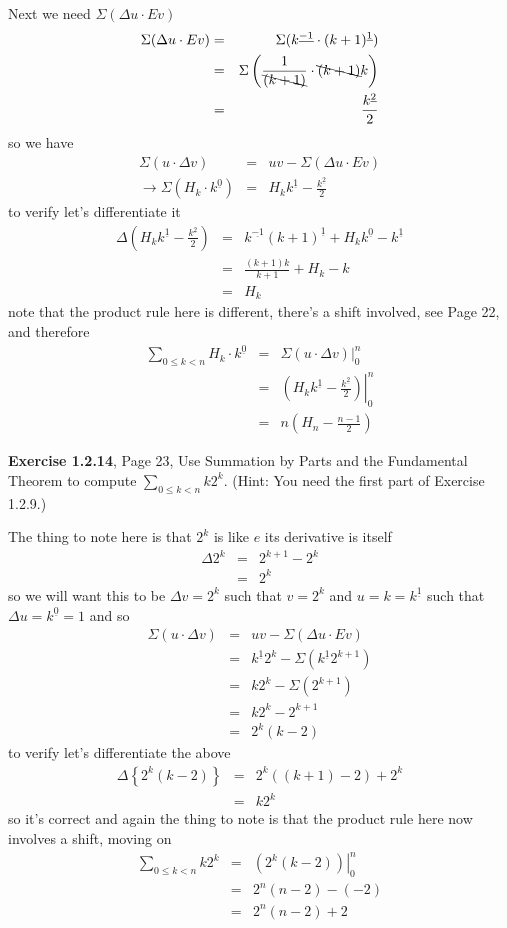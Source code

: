 \documentclass[aps,preprint,preprintnumbers,nofootinbib,showpacs,prd]{revtex4-1}
\newcommand{\nbea}{\begin{eqnarray*}}
\newcommand{\neea}{\end{eqnarray*}}
\begin{document}
Next we need $\Sigma(\Delta u\cdot Ev)$
%
\nbea
\Sigma(\Delta u\cdot Ev) & = & \Sigma(k^{\underline{-1}} \cdot (k+1)^{\underline 1}) \\
& = & \Sigma\left(\frac{1}{\bcancel{(k+1)}}\cdot \bcancel{(k+1)}k \right) \\
& = & \frac{k^{\underline 2}}{2}
\neea
%
so we have
%
\nbea
\Sigma (u\cdot\Delta v) & = & uv - \Sigma(\Delta u\cdot Ev) \\
\to \Sigma (H_k\cdot k^{\underline 0}) & = & H_k k^{\underline 1} - \frac{k^{\underline 2}}{2}
\neea
%
to verify let's differentiate it
%
\nbea
\Delta\left(H_k k^{\underline 1} - \frac{k^{\underline 2}}{2}\right) & = & k^{\underline {-1}}(k+1)^{\underline 1} + H_k k^{\underline 0} - k^{\underline 1} \\
& = & \frac{(k+1)k}{k+1} + H_k - k \\
& = & H_k
\neea
%
note that the product rule here is different, there's a shift involved, see Page 22, and therefore
%
\nbea
\sum_{0 \le k < n} H_k\cdot k^{\underline 0} & = & \left.\Sigma(u\cdot\Delta v)\right|_0^{n} \\
& = & \left. \left( H_k k^{\underline 1} - \frac{k^{\underline 2}}{2}\right)\right |_0^n\\
& = & n\left(H_n - \frac{n-1}{2}\right)
\neea
%

{\bf Exercise 1.2.14}, Page 23, Use Summation by Parts and the Fundamental Theorem to compute $\sum_{0\le k <n}k2^k$. (Hint: You need the first part of Exercise 1.2.9.)

The thing to note here is that $2^k$ is like $e$ its derivative is itself
%
\nbea
\Delta 2^k & = & 2^{k+1} - 2^k \\
& = & 2^k
\neea
%
so we will want this to be $\Delta v = 2^k$ such that $v = 2^k$ and $u = k = k^{\underline 1}$ such that $\Delta u = k^{\underline 0} = 1$ and so
%
\nbea
\Sigma(u\cdot \Delta v) & = & uv - \Sigma(\Delta u\cdot Ev) \\
& = & k^{\underline 1} 2^k - \Sigma\left(k^{\underline 1} 2^{k+1}\right) \\
& = & k2^k - \Sigma(2^{k+1}) \\
& = & k2^k - 2^{k+1} \\
& = & 2^k(k - 2)
\neea
%
to verify let's differentiate the above
%
\nbea
\Delta\left\{ 2^k(k - 2) \right\} & = & 2^k ((k+1)-2) + 2^k \\
& = & k2^k
\neea
%
so it's correct and again the thing to note is that the product rule here now involves a shift, moving on
%
\nbea
\sum_{0\le k <n} k2^k & = & \left. \left( 2^k(k - 2) \right) \right |_0^n \\
& = & 2^n(n-2) - (-2) \\
& = & 2^n(n-2) + 2
\neea
%
\end{document}
